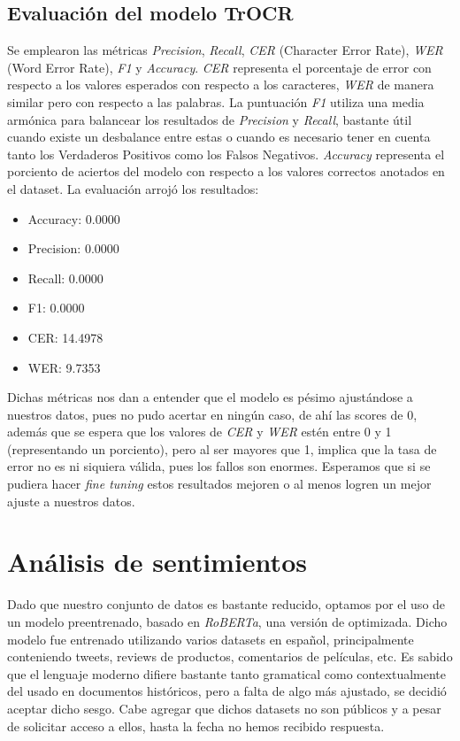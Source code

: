 \documentclass[11pt,a4paper]{article}
\begin{document}
\subsection{Evaluación del modelo TrOCR}
Se emplearon las métricas \textit{Precision}, \textit{Recall}, \textit{CER} (Character Error Rate), \textit{WER} (Word Error Rate), \textit{F1} y \textit{Accuracy}.
\textit{CER} representa el porcentaje de error con respecto a los valores esperados con respecto a los caracteres, \textit{WER} de manera similar pero con respecto a las palabras. 
La puntuación \textit{F1} utiliza una media armónica para balancear los resultados de \textit{Precision} y \textit{Recall}, bastante útil cuando existe un desbalance entre estas o cuando es necesario tener en cuenta tanto los Verdaderos Positivos como los Falsos Negativos. 
\textit{Accuracy} representa el porciento de aciertos del modelo con respecto a los valores correctos anotados en el dataset.
La evaluación arrojó los resultados:

\begin{itemize}
    \item Accuracy: 0.0000
    \item Precision: 0.0000
    \item Recall: 0.0000
    \item F1: 0.0000
    \item CER: 14.4978
    \item WER: 9.7353
\end{itemize}

Dichas métricas nos dan a entender que el modelo es pésimo ajustándose a nuestros datos, pues no pudo acertar en ningún caso, de ahí las scores de 0, además que se espera que los valores de \textit{CER} y \textit{WER} estén entre 0 y 1 (representando un porciento), pero al ser mayores que 1, implica que la tasa de error no es ni siquiera válida, pues los fallos son enormes. 
Esperamos que si se pudiera hacer \textit{fine tuning} estos resultados mejoren o al menos logren un mejor ajuste a nuestros datos.

\section{Análisis de sentimientos}
Dado que nuestro conjunto de datos es bastante reducido, optamos por el uso de un modelo preentrenado, basado en \textit{RoBERTa}, una versión de  optimizada. 
Dicho modelo fue entrenado utilizando varios datasets en español, principalmente conteniendo tweets, reviews de productos, comentarios de películas, etc. 
Es sabido que el lenguaje moderno difiere bastante tanto gramatical como contextualmente del usado en documentos históricos, pero a falta de algo más ajustado, se decidió aceptar dicho sesgo. 
Cabe agregar que dichos datasets no son públicos y a pesar de solicitar acceso a ellos, hasta la fecha no hemos recibido respuesta.
\end{document}
